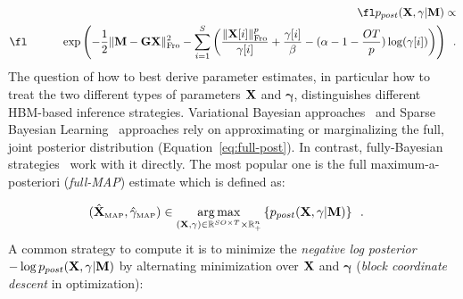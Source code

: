 \begin{eqnarray}
\label{eq:full-post}
\fl \hipost \propto \nonumber \\
\fl \hspace{3em} \exp \left( - \frac{1}{2} \fronormsq{\bfM - \bfG \bfX} - \sum_{i=1}^S \left( \frac{\fronorm{\bfX[i]}^p}{\mathbf{\gamma}[i]} + \frac{\mathbf{\gamma}[i]}{\beta} - (\alpha - 1 - \frac{OT}{p}) \log(\mathbf{\gamma}[i]) \right) \right)\enspace.
\end{eqnarray}
The question of how to best derive parameter estimates, in particular how to treat the two different types of parameters $\mathbf{X}$ and $\mathbf{\gamma}$, distinguishes different HBM-based inference strategies. Variational Bayesian approaches~\cite{mackay2003information,jordan1999introduction,sato2004hierarchical,FrHaDaKiPhTrHeFlMa08,shervashidze2015learning} and Sparse Bayesian Learning~\cite{tipping2001sparse,wipf2004sparse,Wipf-Nagarajan:2009,zhang2011sparse} approaches rely on approximating or marginalizing the full, joint posterior distribution (Equation~\eqref{eq:full-post}). In contrast, fully-Bayesian strategies~\cite{CaHaPuSo09,Lucka-etal:2012} work with it directly. The most popular one is the full maximum-a-posteriori (\emph{full-MAP}) estimate which is defined as:

\begin{eqnarray}
(\xMAP,\gamMAP) & \in \argmax_{(\bfX,\mathbf{\gamma}) \in\R^{SO \times T} \times \R^{n}_+} \left\lbrace \hipost \right\rbrace \enspace.%
\end{eqnarray}
A common strategy  to compute it is to minimize the \emph{negative log posterior} $-\log p_{post}(\mathbf{X},\gamma|\mathbf{M})$ by alternating  minimization over $\mathbf{X}$ and $\mathbf{\gamma}$ (\emph{block coordinate descent} in optimization):

